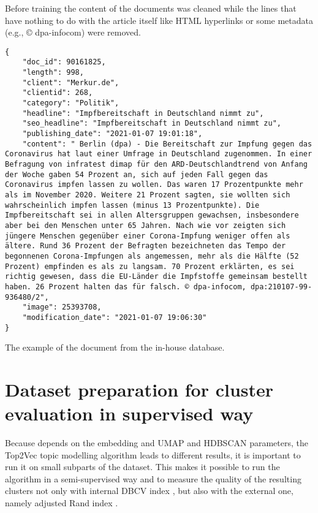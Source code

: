 \documentclass[fontsize=12pt,a4paper,twoside,openany]{scrbook}
\begin{document}
Before training the content of the documents was cleaned while the lines that have nothing to do with the article itself like HTML hyperlinks or some metadata (e.g., © dpa-infocom) were removed.


\begin{listing}[ht!]
\begin{verbatim}
{
    "doc_id": 90161825, 
    "length": 998, 
    "client": "Merkur.de", 
    "clientid": 268, 
    "category": "Politik", 
    "headline": "Impfbereitschaft in Deutschland nimmt zu", 
    "seo_headline": "Impfbereitschaft in Deutschland nimmt zu", 
    "publishing_date": "2021-01-07 19:01:18", 
    "content": " Berlin (dpa) - Die Bereitschaft zur Impfung gegen das Coronavirus hat laut einer Umfrage in Deutschland zugenommen. In einer Befragung von infratest dimap für den ARD-Deutschlandtrend von Anfang der Woche gaben 54 Prozent an, sich auf jeden Fall gegen das Coronavirus impfen lassen zu wollen. Das waren 17 Prozentpunkte mehr als im November 2020. Weitere 21 Prozent sagten, sie wollten sich wahrscheinlich impfen lassen (minus 13 Prozentpunkte). Die Impfbereitschaft sei in allen Altersgruppen gewachsen, insbesondere aber bei den Menschen unter 65 Jahren. Nach wie vor zeigten sich jüngere Menschen gegenüber einer Corona-Impfung weniger offen als ältere. Rund 36 Prozent der Befragten bezeichneten das Tempo der begonnenen Corona-Impfungen als angemessen, mehr als die Hälfte (52 Prozent) empfinden es als zu langsam. 70 Prozent erklärten, es sei richtig gewesen, dass die EU-Länder die Impfstoffe gemeinsam bestellt haben. 26 Prozent halten das für falsch. © dpa-infocom, dpa:210107-99-936480/2", 
    "image": 25393708, 
    "modification_date": "2021-01-07 19:06:30"
}

\end{verbatim}
\caption{The example of the document from the in-house database.} 
\label{listing:json-example}
\end{listing}
 
\section{Dataset preparation for cluster evaluation in supervised way}
\label{sec:exp_setup}

Because depends on the embedding and UMAP and HDBSCAN parameters, the Top2Vec topic modelling algorithm leads to different results, it is important to run it on small subparts of the dataset. This makes it possible to run the algorithm in a semi-supervised way and to measure the quality of the resulting clusters not only with internal DBCV index \parencite{Moulavi14}, but also with the external one, namely adjusted Rand index \parencite{Hubert85}. 
\end{document}
